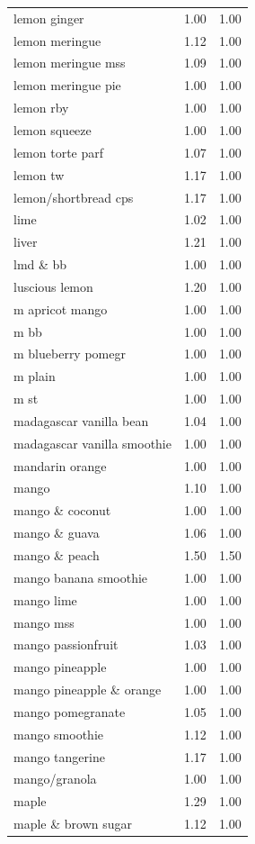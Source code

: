 \begin{table}
\begin{tabular}{lrr}
lemon ginger & 1.00 & 1.00 \\
lemon meringue & 1.12 & 1.00 \\
lemon meringue mss & 1.09 & 1.00 \\
lemon meringue pie & 1.00 & 1.00 \\
lemon rby & 1.00 & 1.00 \\
lemon squeeze & 1.00 & 1.00 \\
lemon torte parf & 1.07 & 1.00 \\
lemon tw & 1.17 & 1.00 \\
lemon/shortbread cps & 1.17 & 1.00 \\
lime & 1.02 & 1.00 \\
liver & 1.21 & 1.00 \\
lmd \& bb & 1.00 & 1.00 \\
luscious lemon & 1.20 & 1.00 \\
m apricot mango & 1.00 & 1.00 \\
m bb & 1.00 & 1.00 \\
m blueberry pomegr & 1.00 & 1.00 \\
m plain & 1.00 & 1.00 \\
m st & 1.00 & 1.00 \\
madagascar vanilla bean & 1.04 & 1.00 \\
madagascar vanilla smoothie & 1.00 & 1.00 \\
mandarin orange & 1.00 & 1.00 \\
mango & 1.10 & 1.00 \\
mango \& coconut & 1.00 & 1.00 \\
mango \& guava & 1.06 & 1.00 \\
mango \& peach & 1.50 & 1.50 \\
mango banana smoothie & 1.00 & 1.00 \\
mango lime & 1.00 & 1.00 \\
mango mss & 1.00 & 1.00 \\
mango passionfruit & 1.03 & 1.00 \\
mango pineapple & 1.00 & 1.00 \\
mango pineapple \& orange & 1.00 & 1.00 \\
mango pomegranate & 1.05 & 1.00 \\
mango smoothie & 1.12 & 1.00 \\
mango tangerine & 1.17 & 1.00 \\
mango/granola & 1.00 & 1.00 \\
maple & 1.29 & 1.00 \\
maple \& brown sugar & 1.12 & 1.00 \\

\end{tabular}
\end{table}
